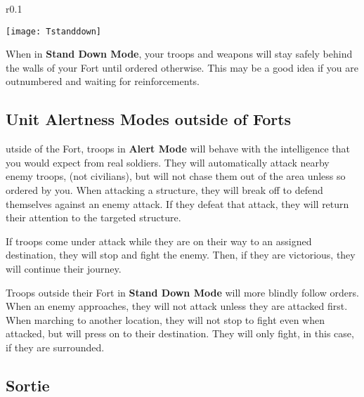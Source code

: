 \begin{wrapfigure}{r}{0.1\textwidth}
    \vspace{-20pt}
    \begin{center}
        \texttt{[image: Tstanddown]}
    \end{center}
    \vspace{-20pt}
\end{wrapfigure}

When in \textbf{Stand Down Mode}, your troops and weapons will stay safely behind the walls of your Fort until ordered otherwise. This may be a good idea if you are outnumbered and waiting for reinforcements.

\subsection{\textsf{Unit Alertness Modes outside of Forts}}



utside of the Fort, troops in \textbf{Alert Mode} will behave with the intelligence that you would expect from real soldiers. They will automatically attack nearby enemy troops, (not civilians), but will not chase them out of the area unless so ordered by you. When attacking a structure, they will break off to defend themselves against an enemy attack. If they defeat that attack, they will return their attention to the targeted structure.

If troops come under attack while they are on their way to an assigned destination, they will stop and fight the enemy. Then, if they are victorious, they will continue their journey.


Troops outside their Fort in \textbf{Stand Down Mode} will more blindly follow orders. When an enemy approaches, they will not attack unless they are attacked first. When marching to another location, they will not stop to fight even when attacked, but will press on to their destination. They will only fight, in this case, if they are surrounded.

\subsection{\textsf{Sortie}}


